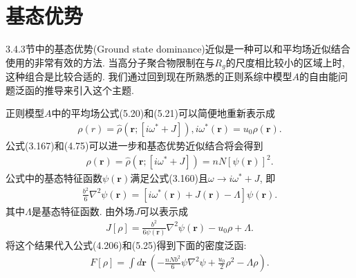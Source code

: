     \section{基态优势}

    3.4.3节中的基态优势(Ground state dominance)近似是一种可以和平均场近似结合使用的非常有效的方法.
    当高分子聚合物限制在与$R_{g}$的尺度相比较小的区域上时,
    这种组合是比较合适的.
    我们通过回到现在所熟悉的正则系综中模型$A$的自由能问题泛函的推导来引入这个主题.
    \par
    正则模型$A$中的平均场公式(5.20)和(5.21)可以简便地重新表示成
    \label{subsec.equations}
    \begin{equation}
        \begin{aligned}
        \rho(r)=\hat{\rho}(\bm{r};[i\omega^{*}+J]),
            i\omega^{*}(\bm{r})=u_{0}\rho(\bm{r}). 
                   \end{aligned}
        \label{eq5.51}
    \end{equation}
    公式(3.167)和(4.75)可以进一步和基态优势近似结合将会得到
    \label{subsec.equations}
    \begin{equation}
        \begin{aligned}
            \rho(\bm{r})=\hat{\rho}(\bm{r};[i\omega^{*}+J])=nN[\psi(\bm{r})]^{2}.
                   \end{aligned}
        \label{eq5.52}
    \end{equation}
    公式中的基态特征函数$\psi(\bm{r})$满足公式(3.160)且$\omega\longrightarrow
    i\omega^{*}+J$, 即
    \label{subsec.equations}
    \begin{equation}
        \begin{aligned}
            \frac{b^2}{6}\nabla^{2}\psi(\bm{r})=[i\omega^{*}(\bm{r})+J(\bm{r})-\Lambda]\psi(\bm{r}).
                   \end{aligned}
        \label{eq5.53}
    \end{equation}
其中$\Lambda$是基态特征函数. 由外场$J$可以表示成
    \label{subsec.equations}
    \begin{equation}
        \begin{aligned}
            J[\rho]=\frac{b^{2}}{6\psi(\bm{r})}\nabla^{2}\psi(\bm{r})-u_{0}\rho+\Lambda.
                   \end{aligned}
        \label{eq5.54}
    \end{equation}
将这个结果代入公式(4.206)和(5.25)得到下面的密度泛函:
    \label{subsec.equations}
    \begin{equation}
        \begin{aligned}
            F[\rho]=\int d\bm{r}\
            \left(-\frac{nNb^{2}}{6}\psi\nabla^{2}\psi+\frac{u_{0}}{2}\rho^{2}-\Lambda\rho
            \right).
                   \end{aligned}
        \label{eq5.55}
    \end{equation}
